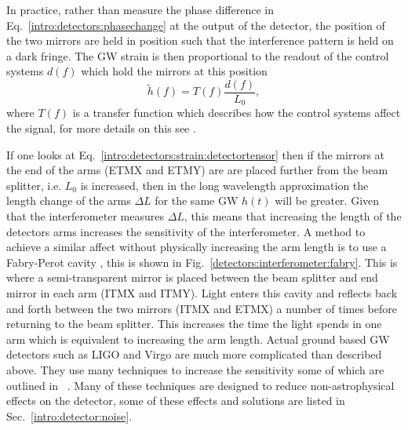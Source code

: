 In practice, rather than measure the phase difference in Eq.~\ref{intro:detectors:phasechange} at the output of the detector, the position of the two mirrors are held in position such that the interference pattern is held on a dark fringe.
%
%
The \gls{GW} strain is then proportional to the readout of the control systems $d(f)$ which hold the mirrors at this position \cite{ligoscientificcollaboration2017CalibrationAdvanced} 
\begin{equation}
    \tilde{h}(f) = T(f) \frac{d(f)}{L_0},
\end{equation}
where $T(f)$ is a transfer function which describes how the control systems affect the signal, for more details on this see \cite{ligoscientificcollaboration2017CalibrationAdvanced}.

If one looks at Eq.~\ref{intro:detectors:strain:detectortensor} then if the mirrors at the
end of the arms (\gls{ETMX} and \gls{ETMY}) are are placed
further from the beam splitter, i.e. $L_0$ is increased, then in the long wavelength approximation the length change
of the arms $\Delta L$ for the same \gls{GW} $h(t)$ will be greater.  Given that the interferometer measures $\Delta L$, this means that
increasing the length of the detectors arms increases the sensitivity of the
interferometer.  A method to achieve a similar affect without physically
increasing the arm length is to use a Fabry-Perot cavity
\citep{aasi2015AdvancedLIGO}, this is shown in
Fig.~\ref{detectors:interferometer:fabry}.  This is where a semi-transparent
mirror is placed between the beam splitter and end mirror in each arm (\gls{ITMX} and
\gls{ITMY}).  Light enters this cavity and reflects
back and forth between the two mirrors (\gls{ITMX} and \gls{ETMX}) a number of times before
returning to the beam splitter.  This increases the time the light spends in
one arm which is equivalent to increasing the arm length.  
Actual ground based \gls{GW} detectors such as \gls{LIGO} \citep{abbott2009LIGOLaser} and
Virgo \citep{acernese2015AdvancedVirgo} are much more complicated than
described above.  They use many techniques to increase the sensitivity some of
which are outlined in
\citep{aasi2015AdvancedLIGO,abbott2009LIGOLaser}~.  Many of these techniques are
designed to reduce non-astrophysical effects on the detector,
some of these effects and solutions are listed in
Sec.~\ref{intro:detector:noise}.

